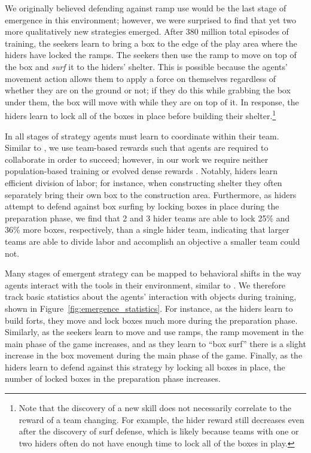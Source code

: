 We originally believed defending against ramp use would be the last stage of emergence in this environment; however, we were surprised to find that yet two more qualitatively new strategies emerged. After 380 million total episodes of training, the seekers learn to bring a box to the edge of the play area where the hiders have locked the ramps.
The seekers then use the ramp to move on top of the box and \textit{surf} it to the hiders' shelter. This is possible because the agents' movement action allows them to apply a force on themselves regardless of whether they are on the ground or not; if they do this while grabbing the box under them, the box will move with while they are on top of it.
In response, the hiders learn to lock all of the boxes in place before building their shelter.\footnote{Note that the discovery of a new skill does not necessarily correlate to the reward of a team changing.
For example, the hider reward still decreases even after the discovery of surf defense, which is likely because teams with one or two hiders often do not have enough time to lock all of the boxes in play.}

In all stages of strategy agents must learn to coordinate within their team. Similar to \cite{liu2019emergent}, we use team-based rewards such that agents are required to collaborate in order to succeed; however, in our work we require neither population-based training \citep{jaderberg2017population} or evolved dense rewards \citep{Jaderberg859}. Notably, hiders learn efficient division of labor; for instance, when constructing shelter they often separately bring their own box to the construction area. Furthermore, as hiders attempt to defend against box surfing by locking boxes in place during the preparation phase, we find that 2 and 3 hider teams are able to lock 25\% and 36\% more boxes, respectively, than a single hider team, indicating that larger teams are able to divide labor and accomplish an objective a smaller team could not.

Many stages of emergent strategy can be mapped to behavioral shifts in the way agents interact with the tools in their environment, similar to \cite{leibo2017multi, perolat2017}.
We therefore track basic statistics about the agents' interaction with objects during training, shown in Figure~\ref{fig:emergence_statistics}. For instance, as the hiders learn to build forts, they move and lock boxes much more during the preparation phase. Similarly, as the seekers learn to move and use ramps, the ramp movement in the main phase of the game increases, and as they learn to ``box surf'' there is a slight increase in the box movement during the main phase of the game. Finally, as the hiders learn to defend against this strategy by locking all boxes in place, the number of locked boxes in the preparation phase increases.

